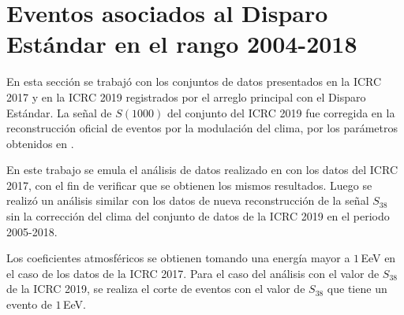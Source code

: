 
\section{Eventos asociados al Disparo Estándar en el rango 2004-2018}\label{Stan_modulacion}	
	
En esta sección se trabajó con los conjuntos de datos  presentados en la ICRC 2017  y  en la ICRC 2019 registrados por el arreglo principal con el Disparo Estándar. La señal de $S(1000)$ del conjunto del ICRC 2019 fue corregida en la reconstrucción oficial de eventos por la modulación del clima, por los parámetros obtenidos en \cite{aab2017impact}. 

En este trabajo se emula el análisis de datos realizado en \cite{aab2017impact} con los datos del ICRC 2017, con el fin de verificar que se obtienen los mismos resultados. Luego se realizó un análisis similar con los datos de nueva reconstrucción de la señal $S_{38}$ sin la corrección del clima  del conjunto de datos de la ICRC 2019 en el periodo 2005-2018. 

Los coeficientes atmosféricos se obtienen tomando una energía mayor a $1\,$EeV en el caso de los datos de la ICRC 2017. Para el caso del análisis con el valor de $S_{38}$ de la ICRC 2019, se realiza el corte de eventos con el valor de $S_{38}$  que tiene un evento de $1\,$EeV.  


